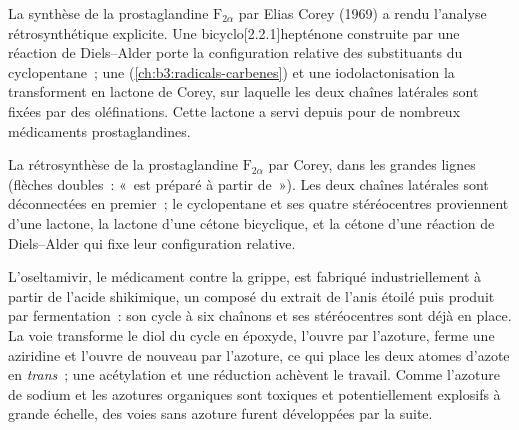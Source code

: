 La synthèse de la prostaglandine $\mathrm F_{2\alpha}$ par Elias Corey (1969) a rendu l'analyse
rétrosynthétique explicite. Une bicyclo[2.2.1]hepténone construite par une
réaction de Diels--Alder porte la configuration relative des substituants
du cyclopentane~; une 
(\cref{ch:b3:radicals-carbenes}) et une iodolactonisation la transforment
en lactone de Corey, sur laquelle les deux chaînes latérales sont fixées
par des oléfinations. Cette lactone a servi depuis pour de nombreux
médicaments prostaglandines.

\begin{omfigure}

{\small La rétrosynthèse de la prostaglandine $\mathrm F_{2\alpha}$ par Corey, dans les grandes lignes (flèches doubles~: «~est
préparé à partir de~»). Les deux chaînes latérales sont déconnectées en
premier~; le cyclopentane et ses quatre stéréocentres proviennent d'une
lactone, la lactone d'une cétone bicyclique, et la cétone d'une réaction de
Diels--Alder qui fixe leur configuration relative.}
\end{omfigure}

L'oseltamivir, le médicament contre la grippe, est fabriqué industriellement
à partir de l'acide shikimique, un composé du  extrait de
l'anis étoilé puis produit par fermentation~: son cycle à six chaînons et
ses stéréocentres sont déjà en place. La voie transforme le diol du cycle
en époxyde, l'ouvre par l'azoture, ferme une aziridine et l'ouvre de
nouveau par l'azoture, ce qui place les deux atomes d'azote en
\textit{trans}~; une acétylation et une réduction achèvent le travail. Comme l'azoture
de sodium et les azotures organiques sont toxiques et potentiellement
explosifs à grande échelle, des voies sans azoture furent développées par
la suite.

